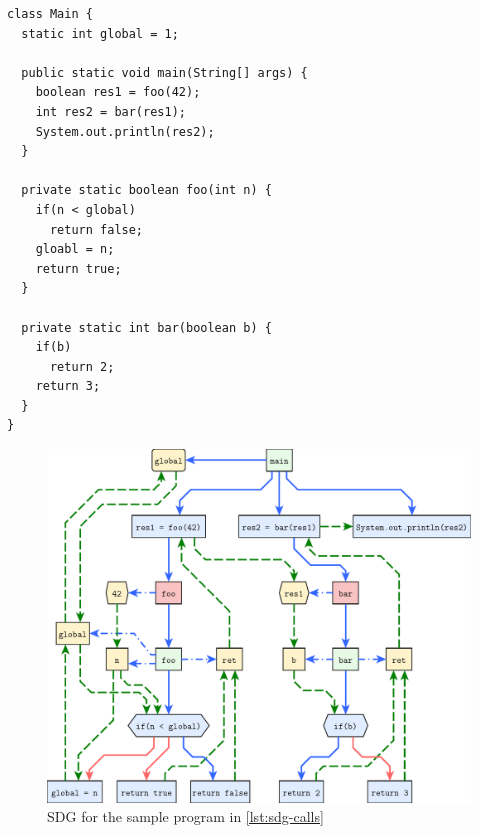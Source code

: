 \begin{lstlisting}[float=p,label=lst:sdg-calls,
  caption={Program with calls resulting in the SDG in \autoref{fig:sdg-calls}}]
class Main {
  static int global = 1;
  
  public static void main(String[] args) {
    boolean res1 = foo(42);
    int res2 = bar(res1);
    System.out.println(res2);
  }
  
  private static boolean foo(int n) {
    if(n < global)
      return false;
    gloabl = n;
    return true;
  }
  
  private static int bar(boolean b) {
    if(b)
      return 2;
    return 3;
  }
}
\end{lstlisting}

\begin{figure}[p]
  \centering
    \includegraphics[scale=0.6]{sdgs/calls}
  \caption{SDG for the sample program in \autoref{lst:sdg-calls}}
  \label{fig:sdg-calls}
\end{figure}
